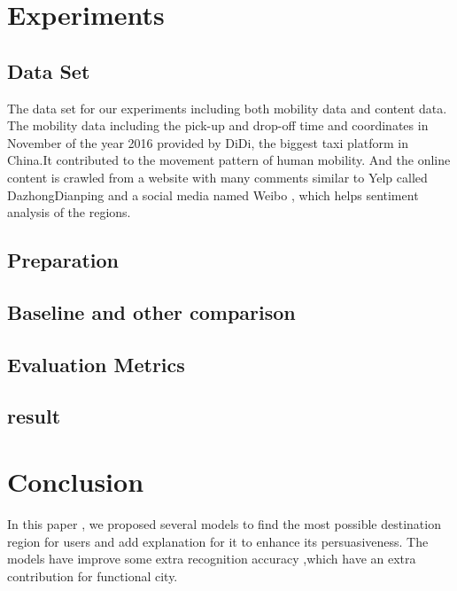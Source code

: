 \documentclass[runningheads]{llncs}
\begin{document}

\section{Experiments}

\subsection{Data Set}
The data set for our experiments including both mobility data and content data.
The mobility data including the pick-up and drop-off time and coordinates in November of the year 2016 provided by DiDi, the biggest taxi platform in China.It contributed to the movement pattern of human mobility.
And the online content is crawled from a website with many comments similar to Yelp called DazhongDianping and a social media named Weibo , which helps sentiment analysis of the regions.

\subsection{Preparation}

\subsection{Baseline and other comparison}

\subsection{Evaluation Metrics}

\subsection{result}

\section{Conclusion}
In this paper , we proposed several models to find the most possible destination region for users and add explanation for it to enhance its persuasiveness.
The models have improve some extra recognition accuracy ,which have an extra contribution for functional city.
\end{document}
